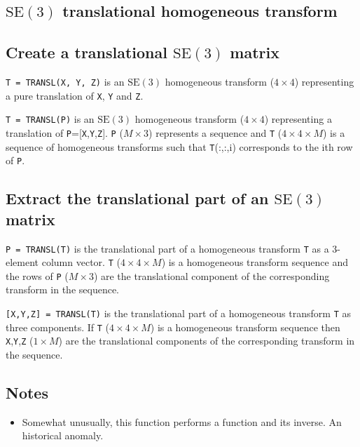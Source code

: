 \subsection*{$\mbox{SE}(3)$ translational homogeneous transform}

\subsection*{Create a translational $\mbox{SE}(3)$ matrix}


\texttt{T = TRANSL(X, Y, Z)} is an $\mbox{SE}(3)$ homogeneous transform ($4 \times 4$) representing
a pure translation of \texttt{X}, \texttt{Y} and \texttt{Z}.



\texttt{T = TRANSL(P)} is an $\mbox{SE}(3)$ homogeneous transform ($4 \times 4$) representing a
translation of \texttt{P}=[\texttt{X},\texttt{Y},\texttt{Z}]. \texttt{P} ($M \times 3$) represents a sequence and \texttt{T}
($4 \times 4 \times M$) is a sequence of homogeneous transforms such that \texttt{T}(:,:,i)
corresponds to the i\textquotesingle th row of \texttt{P}.


\subsection*{Extract the translational part of an $\mbox{SE}(3)$ matrix}


\texttt{P = TRANSL(T)} is the translational part of a homogeneous transform \texttt{T} as a
3-element column vector.  \texttt{T} ($4 \times 4 \times M$) is a homogeneous transform
sequence and the rows of \texttt{P} ($M \times 3$) are the translational component of the
corresponding transform in the sequence.



\texttt{[X,Y,Z] = TRANSL(T)} is the translational part of a homogeneous transform
\texttt{T} as three components.  If \texttt{T} ($4 \times 4 \times M$) is a homogeneous transform sequence
then \texttt{X},\texttt{Y},\texttt{Z} ($1 \times M$) are the translational components of the corresponding
transform in the sequence.


\subsection*{Notes}
\begin{itemize}
  \item Somewhat unusually, this function performs a function and its inverse.  An    historical anomaly.
\end{itemize}

